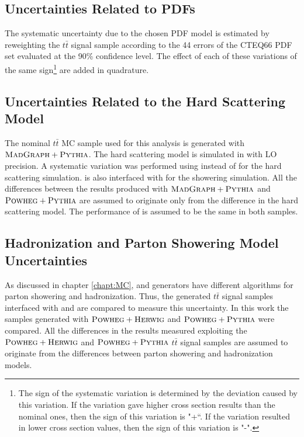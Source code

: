 \subsection{Uncertainties Related to PDFs}\label{sec:syst_PDF}

The systematic uncertainty due to the chosen PDF model is estimated by reweighting the $t\bar{t}$ signal sample according to the 
44 errors of the CTEQ66 PDF set evaluated at the 90\% confidence level\cite{Lai:2010vv}. The effect of each of these variations
of the same sign\footnote{The sign of the systematic variation is determined by the deviation caused by this
variation. If the variation gave higher cross section results than the nominal ones, then the sign of this variation is "+``. 
If the variation resulted in lower cross section values, then the sign of this variation is "-".} are added in quadrature.


\subsection{Uncertainties Related to the Hard Scattering Model}

The nominal $t\bar{t}$ MC sample used for this analysis is generated with $\textsc{MadGraph}+\textsc{Pythia}$. The hard scattering model is simulated
in \MG with LO precision. A systematic variation was performed using \Powheg instead of \MG for the hard scattering simulation.
\Powheg is also interfaced with \PYTHIA for the showering simulation. All the differences between the results produced with $\textsc{MadGraph}+\textsc{Pythia}$
and $\textsc{Powheg}+\textsc{Pythia}$ are assumed to originate only from the difference in the hard scattering model. The performance of \PYTHIA is assumed 
to be the same in both samples.

\subsection{Hadronization and Parton Showering Model Uncertainties}

As discussed in chapter \ref{chapt:MC}, \PYTHIA and \HERWIG generators have different algorithms for parton showering and hadronization.
Thus, the generated $t\bar{t}$ signal samples interfaced with \PYTHIA and \HERWIG are compared to measure this uncertainty. In this work
the samples generated with $\textsc{Powheg}+\textsc{Herwig}$ and $\textsc{Powheg}+\textsc{Pythia}$ were compared. All the differences in the results measured exploiting the
$\textsc{Powheg}+\textsc{Herwig}$ and $\textsc{Powheg}+\textsc{Pythia}$ $t\bar{t}$ signal samples are assumed to originate from the differences between parton showering
and hadronization models.

